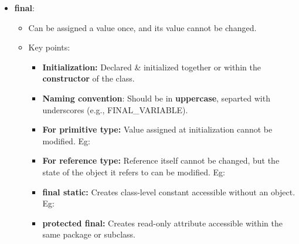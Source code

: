 \begin{flushleft}
\begin{itemize}
		\item \textbf{final}:
		\begin{itemize}
			\item Can be assigned a value once, and its value cannot be changed. 
			\item Key points:
			\begin{itemize}
				\item \textbf{Initialization:} Declared \& initialized together or within the \textbf{constructor} of the class.
				\item \textbf{Naming convention}: Should be in \textbf{uppercase}, separted with underscores (e.g., FINAL\_VARIABLE).
				\item \textbf{For primitive type:} Value assigned at initialization cannot be modified. Eg:
				\bigskip
				\bigskip
				\item \textbf{For reference type:} Reference itself cannot be changed, but the state of the object it refers to can be modified. Eg:
				\bigskip
				\newpage
				\item \textbf{final static:} Creates class-level constant accessible without an object. Eg:
				\bigskip
				\bigskip				
				\item \textbf{protected final:} Creates read-only attribute accessible within the same package or subclass.
				\bigskip
			\end{itemize}
		\end{itemize}
	

\end{itemize}
\end{flushleft}
